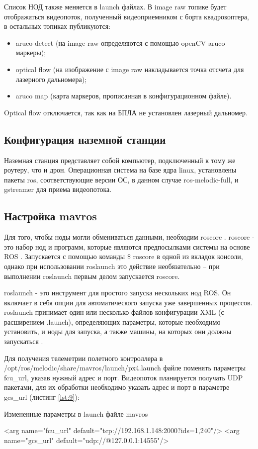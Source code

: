 Список НОД также меняется в launch файлах. В image raw топике будет отображаться видеопоток, полученный видеоприемником с борта квадрокоптера, в остальных топиках публикуются:
\begin{itemize}
	\item aruco-detect (на image raw определяются с помощью openCV aruco маркеры);
	\item optical flow (на изображение с image raw накладывается точка отсчета для лазерного дальномера);
	\item aruco map (карта маркеров, прописанная в конфигурационном файле).
\end{itemize}

Optical flow отключается, так как на БПЛА не установлен лазерный дальномер.
\subsection{Конфигурация наземной станции}
Наземная станция представляет собой компьютер, подключенный к тому же роутеру, что и дрон. Операционная система на базе ядра linux, установлены пакеты ros, соответствующие версии ОС, в данном случае ros-melodic-full, и gstreamer для приема видеопотока.

\subsection{Настройка mavros}
Для того, чтобы ноды могли обмениваться данными, необходим roscore \cite{pkg}. roscore - это набор нод и программ, которые являются предпосылками системы на основе ROS \cite{ros}. Запускается с помощью команды \$ roscore в одной из вкладок консоли, однако при использовании roslaunch это действие необязательно -- при выполнении roslaunch первым делом запускается roscore.

roslaunch - это инструмент для простого запуска нескольких нод ROS. Он включает в себя опции для автоматического запуска уже завершенных процессов. roslaunch принимает один или несколько файлов конфигурации XML (с расширением .launch), определяющих параметры, которые необходимо установить, и ноды для запуска, а также машины, на которых они должны запускаться \cite{ros}.

Для получения телеметрии полетного контроллера в /opt/ros/melodic/sha\-re/mavros/launch/px4.launch файле поменять параметры fcu\_url, указав нужный адрес и порт. Видеопоток планируется получать UDP пакетами, для их обработки необходимо указать адрес и порт в параметре gcs\_url (листинг \ref{lst:9}):
\begin{Program}[H]
	\caption{Измененные параметры в launch файле mavros} \label{lst:9}
	\begin{MyCode}
	<arg name="fcu_url" default="tcp://192.168.1.148:2000?ids=1,240"/>   
	<arg name="gcs_url" default="udp://@127.0.0.1:14555"/>
	\end{MyCode}
\end{Program}

